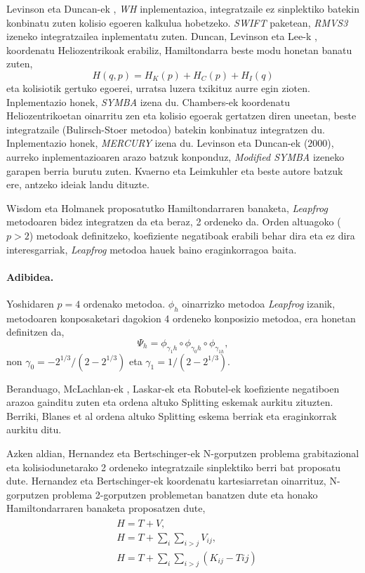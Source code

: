 Levinson eta Duncan-ek \cite[1994]{Levison1994}, \emph{WH} inplementazioa, integratzaile ez sinplektiko batekin konbinatu zuten kolisio egoeren kalkulua hobetzeko. \emph{SWIFT} paketean, \emph{RMVS3} izeneko integratzailea inplementatu zuten. Duncan, Levinson eta Lee-k \cite[1998]{Duncan1998}, koordenatu Heliozentrikoak erabiliz, Hamiltondarra beste modu honetan banatu zuten,  
\begin{equation*}
H(q,p)=H_K(p)+H_C(p)+H_I(q)
\end{equation*}
eta kolisiotik gertuko egoerei, urratsa luzera txikituz aurre egin zioten. Inplementazio honek, \emph{SYMBA} izena du. Chambers-ek \cite{Chambers1999} koordenatu Heliozentrikoetan oinarritu zen eta kolisio egoerak gertatzen diren uneetan, beste integratzaile  (Bulirsch-Stoer metodoa) batekin konbinatuz integratzen du. Inplementazio honek, \emph{MERCURY} izena du. Levinson eta Duncan-ek ($2000$), aurreko inplementazioaren arazo batzuk konponduz, \emph{Modified SYMBA} izeneko garapen berria burutu zuten.
Kvaerno eta Leimkuhler \cite{Kvaerno2000} eta beste autore batzuk ere, antzeko ideiak landu dituzte.

Wisdom eta Holmanek proposatutko Hamiltondarraren banaketa, \emph{Leapfrog} metodoaren bidez integratzen da eta beraz, 2 ordeneko da. Orden altuagoko ($p>2$) metodoak definitzeko, koefiziente negatiboak erabili behar dira \cite{Yoshida1993,Laskar2001} eta ez dira interesgarriak, \emph{Leapfrog} metodoa hauek baino eraginkorragoa baita. 

\paragraph*{Adibidea.}
Yoshidaren $p=4$ ordenako metodoa. $\phi_h$ oinarrizko metodoa \emph{Leapfrog} izanik, metodoaren konposaketari dagokion 4 ordeneko konposizio metodoa, era honetan definitzen da,
\begin{equation*}
\Psi_h=\phi_{\gamma_1 h} \circ \phi_{\gamma_0 h} \circ \phi_{\gamma_{1 h}},
\end{equation*}  
non  $\gamma_0=-2^{1/3}/(2-2^{1/3})$ eta $\gamma_1=1/(2-2^{1/3})$.

Beranduago, McLachlan-ek \cite[1995]{McLachlan1995}, Laskar-ek eta Robutel-ek \cite[2001]{Laskar2001} koefiziente negatiboen arazoa gainditu zuten eta ordena altuko Splitting eskemak aurkitu zituzten. Berriki, Blanes et al \cite[2012]{Blanes2013} ordena altuko Splitting eskema berriak eta eraginkorrak aurkitu ditu. 

Azken aldian, Hernandez eta Bertschinger-ek \cite[2015]{Hernandez2015} N-gorputzen problema grabitazional eta kolisiodunetarako 2 ordeneko integratzaile sinplektiko berri bat proposatu dute. Hernandez eta Bertschinger-ek \cite{Hernandez2015} koordenatu kartesiarretan oinarrituz, N-gorputzen problema 2-gorputzen problemetan banatzen dute eta honako Hamiltondarraren banaketa proposatzen dute,
\begin{align}
\begin{split}
&H=T+V, \\
&H=T+ \sum_{i} \sum_{i>j} V_{ij}, \\
&H=T+ \sum_{i} \sum_{i>j} (K_{ij}-T{ij})
\end{split}
\end{align}


